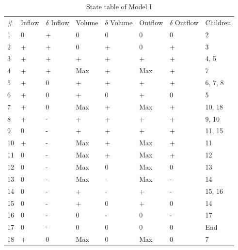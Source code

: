 \documentclass{article}
\begin{document}
\begin{table}[]
	\centering
	\caption{State table of Model I}
	\label{table1}
	\begin{tabular}{llllllll}
		\# & Inflow & $\delta$ Inflow & Volume & $\delta$ Volume & Outflow & $\delta$ Outflow & Children \\
		1  & 0      & +               & 0      & 0               & 0       & 0                & 2        \\
		2  & +      & +               & 0      & +               & 0       & +                & 3        \\
		3  & +      & +               & +      & +               & +       & +                & 4, 5     \\
		4  & +      & +               & Max    & +               & Max     & +                & 7        \\
		5  & +      & 0               & +      & +               & +       & +                & 6, 7, 8  \\
		6  & +      & 0               & +      & 0               & +       & 0                & 5        \\
		7  & +      & 0               & Max    & +               & Max     & +                & 10, 18   \\
		8  & +      & -               & +      & +               & +       & +                & 9, 10    \\
		9  & 0      & -               & +      & +               & +       & +                & 11, 15   \\
		10 & +      & -               & Max    & +               & Max     & +                & 11       \\
		11 & 0      & -               & Max    & +               & Max     & +                & 12       \\
		12 & 0      & -               & Max    & 0               & Max     & 0                & 13       \\
		13 & 0      & -               & Max    & -               & Max     & -                & 14       \\
		14 & 0      & -               & +      & -               & +       & -                & 15, 16   \\
		15 & 0      & -               & +      & 0               & +       & 0                & 14       \\
		16 & 0      & -               & 0      & -               & 0       & -                & 17       \\
		17 & 0      & -               & 0      & 0               & 0       & 0                & End      \\
		18 & +      & 0               & Max    & 0               & Max     & 0                & 7       
	\end{tabular}
\end{table}
\end{document}
